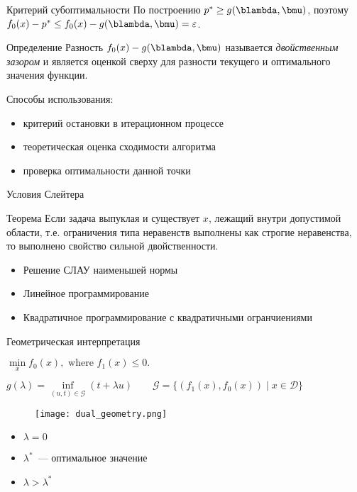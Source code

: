 \documentclass[12pt]{beamer}
\begin{document}
\begin{frame}{Критерий субоптимальности}
По построению $p^* \geq g(\blambda, \bmu)$, поэтому $f_0(x) - p^* \leq f_0(x) - g(\blambda, \bmu) = \varepsilon$.
\begin{block}{Определение}
Разность $f_0(x) - g(\blambda, \bmu)$ называется \emph{двойственным зазором} и является оценкой сверху для разности текущего и оптимального значения функции.
\end{block}
Способы использования:
\begin{itemize}
\item критерий остановки в итерационном процессе
\item теоретическая оценка сходимости алгоритма
\item проверка оптимальности данной точки
\end{itemize}
\end{frame}

\begin{frame}{Условия Слейтера}
\begin{block}{Теорема}
Если задача выпуклая и существует $x$, лежащий внутри допустимой области, т.е. ограничения типа неравенств выполнены как строгие неравенства, то выполнено свойство сильной двойственности.
\end{block}

\begin{itemize}
\item Решение СЛАУ наименьшей нормы
\item Линейное программирование
\item Квадратичное программирование с квадратичными огранчиениями
\end{itemize}
\end{frame}

\begin{frame}{Геометрическая интерпретация}
\begin{center}
$\min\limits_{x} f_0(x), \text{ where } f_1(x) \leq 0.$
\end{center}
$
g(\lambda) = \inf\limits_{(u, t) \in \mathcal{G}} (t + \lambda u) \qquad \mathcal{G} = \{ (f_1(x), f_0(x)) \; | \; x \in \mathcal{D} \}
$

\begin{figure}
\centering
\texttt{[image: dual\_geometry.png]}
\end{figure}
\begin{itemize}
\item $\lambda = 0$
\item $\lambda^*$~--- оптимальное значение
\item $\lambda > \lambda^*$
\end{itemize}
\end{frame}
\end{document}

